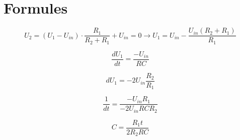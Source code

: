 \section{Formules}

\begin{equation}
    U_2=(U_1-U_{in})\cdot\frac{R_1}{R_2+R_1}+U_{in}=0 \rightarrow U_1=U_{in}-\frac{U_{in}(R_2+R_1)}{R_1}
\end{equation}

\begin{equation}
    \frac{dU_1}{dt}=\frac{-U_{in}}{RC}
\end{equation}

\begin{equation}
    dU_1=-2U_{in}\frac{R_2}{R_1}
\end{equation}

\begin{equation}
    \frac{1}{dt}=\frac{-U_{in}R_1}{-2U_{in}RCR_2}
\end{equation}

\begin{equation}
    C=\frac{R_1t}{2R_2RC}
\end{equation}